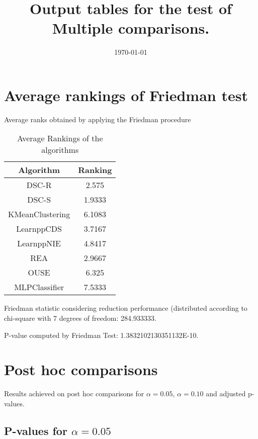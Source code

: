 \documentclass[a4paper,10pt]{article}
\title{Output tables for the test of Multiple comparisons.}
\author{}
\date{\today}
\begin{document}
\begin{landscape}
\pagestyle{empty}
\maketitle
\thispagestyle{empty}
\section{Average rankings of Friedman test}



Average ranks obtained by applying the Friedman procedure

\begin{table}[!htp]
\centering
\begin{tabular}{|c|c|}\hline
Algorithm&Ranking\\\hline
DSC-R & 2.575\\
DSC-S & 1.9333\\
KMeanClustering & 6.1083\\
LearnppCDS & 3.7167\\
LearnppNIE & 4.8417\\
REA & 2.9667\\
OUSE & 6.325\\
MLPClassifier & 7.5333\\
\hline
\end{tabular}
\caption{Average Rankings of the algorithms}
\end{table}

Friedman statistic considering reduction performance (distributed according to chi-square with 7 degrees of freedom: 284.933333.

P-value computed by Friedman Test: 1.3832102130351132E-10.\newline



\pagebreak

\section{Post hoc comparisons}

Results achieved on post hoc comparisons for $\alpha = 0.05$, $\alpha = 0.10$ and adjusted p-values.

\subsection{P-values for $\alpha=0.05$}


\end{landscape}
\end{document}
